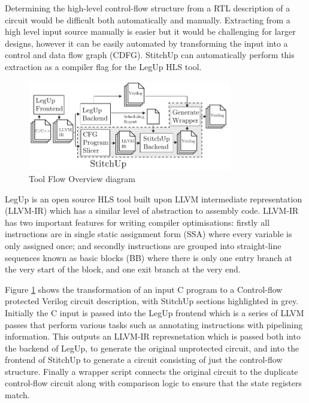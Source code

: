 Determining the high-level control-flow structure from a RTL description
of a circuit would be difficult both automatically and manually.
Extracting from a high level input source manually is easier but it would
be challenging for larger designs, however it can be easily automated by
transforming the input into a control and data flow graph (CDFG).
StitchUp can automatically perform this extraction as a compiler flag
for the LegUp HLS tool.

\begin{figure}[t]
\centering
\includegraphics[width=3.5in]{./imgs/tool-flow.pdf}
\caption{Tool Flow Overview diagram}
\label{fig:tool_flow_diagram}
\end{figure}

LegUp is an open source HLS tool built upon LLVM intermediate representation (LLVM-IR) which has
a similar level of abstraction to assembly code.
LLVM-IR has two important features for writing compiler optimisations:
firstly all instructions are in single static assignment form (SSA) where every variable is only
assigned once; and secondly instructions are grouped into straight-line sequences known as basic blocks (BB)
where there is only one entry branch at the very start of the block, and one exit branch at the very end.

Figure \ref{fig:tool_flow_diagram} shows the transformation of an input C program
to a Control-flow protected
Verilog circuit description, with StitchUp sections highlighted in grey.
Initially the C input is passed into the LegUp frontend which is
a series of LLVM passes that
perform various tasks such as annotating instructions with pipelining information.
This outputs an LLVM-IR represnetation which is passed both into the backend of LegUp,
to generate the
original unprotected circuit, and into the frontend of StitchUp to generate a circuit
consisting of just the control-flow structure.
Finally a wrapper script connects the original circuit to the duplicate control-flow circuit
along with comparison logic to ensure that the state registers match.

